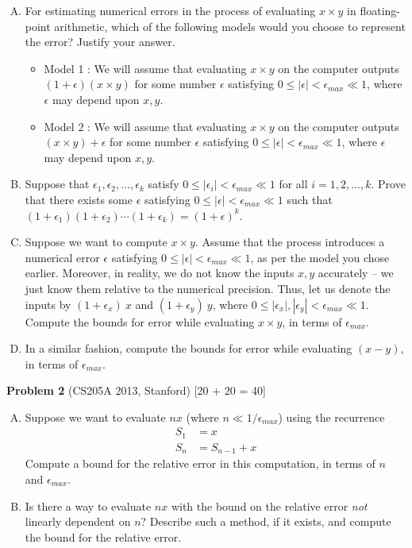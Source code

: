 \documentclass[11pt,a4paper]{article}
\begin{document}
\begin{enumerate}[A.]
\item For estimating numerical errors in the process of evaluating $x \times y$ in floating-point arithmetic, which of the following models would you choose to represent the error? Justify your answer.
\begin{itemize}
\item \textsf{Model 1} : We will assume that evaluating $x \times y$ on the computer outputs $(1 + \epsilon)(x \times y)$ for some number $\epsilon$ satisfying $0 \leq |\epsilon| < \epsilon_{max} \ll 1$, where $\epsilon$ may depend upon $x, y$.
\item \textsf{Model 2} : We will assume that evaluating $x \times y$ on the computer outputs $(x \times y) + \epsilon$ for some number $\epsilon$ satisfying $0 \leq |\epsilon| < \epsilon_{max} \ll 1$, where $\epsilon$ may depend upon $x, y$.
\end{itemize}

\item Suppose that $\epsilon_1, \epsilon_2, \ldots, \epsilon_k$ satisfy $0 \leq |\epsilon_i| < \epsilon_{max} \ll 1$ for all $i = 1, 2, \ldots, k$. Prove that there exists some $\epsilon$ satisfying $0 \leq |\epsilon| < \epsilon_{max} \ll 1$ such that $(1 + \epsilon_1)(1 + \epsilon_2) \cdots (1 + \epsilon_k) = (1 + \epsilon)^k$.

\item Suppose we want to compute $x \times y$. Assume that the process introduces a numerical error $\epsilon$ satisfying $0 \leq |\epsilon| < \epsilon_{max} \ll 1$, as per the model you chose earlier. Moreover, in reality, we do not know the inputs $x, y$ accurately -- we just know them relative to the numerical precision. Thus, let us denote the inputs by $(1 + \epsilon_x) \ x$ and $(1 + \epsilon_y) \ y$, where $0 \leq |\epsilon_x|, |\epsilon_y| < \epsilon_{max} \ll 1$. Compute the bounds for error while evaluating $x \times y$, in terms of $\epsilon_{max}$.

\item In a similar fashion, compute the bounds for error while evaluating $(x - y)$, in terms of $\epsilon_{max}$.
\end{enumerate}


{\large\textbf{Problem 2}} (CS205A 2013, Stanford) \hfill [20 + 20 = 40]

\begin{enumerate}[A.]
\item Suppose we want to evaluate $nx$ (where $n \ll 1/\epsilon_{max}$) using the recurrence
\begin{align*}
S_1 &= x \\
S_n &= S_{n-1} + x
\end{align*}
Compute a bound for the relative error in this computation, in terms of $n$ and $\epsilon_{max}$. 

\item Is there a way to evaluate $nx$ with the bound on the relative error \emph{not} linearly dependent on $n$? Describe such a method, if it exists, and compute the bound for the relative error.
\end{enumerate}
\end{document}
